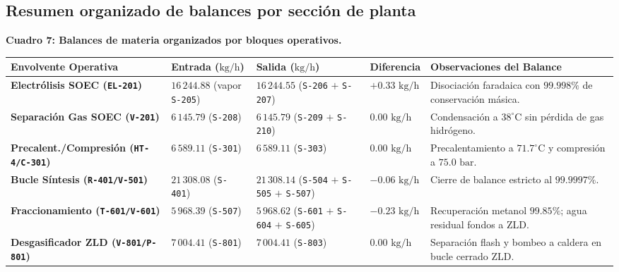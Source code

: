 \documentclass[11pt,letterpaper]{article}
\begin{document}
\subsection{Resumen organizado de balances por sección de planta}

\begin{center}
\footnotesize
\setlength{\tabcolsep}{4pt}
\renewcommand{\arraystretch}{0.98}
\textbf{Cuadro 7: Balances de materia organizados por bloques operativos.}\\[2pt]
\begin{tabularx}{\textwidth}{>{\raggedright\arraybackslash}p{3.8cm} >{\centering\arraybackslash}p{2.7cm} >{\centering\arraybackslash}p{2.9cm} >{\centering\arraybackslash}p{1.9cm} >{\raggedright\arraybackslash}X}
\toprule
\textbf{Envolvente Operativa} & \textbf{Entrada ($\text{kg/h}$)} & \textbf{Salida ($\text{kg/h}$)} & \textbf{Diferencia} & \textbf{Observaciones del Balance} \\
\midrule
\textbf{Electrólisis SOEC (\texttt{EL-201})} & $16\,244.88$ (vapor \texttt{S-205}) & $16\,244.55$ (\texttt{S-206} $+$ \texttt{S-207}) & $+0.33\text{ kg/h}$ & Disociación faradaica con $99.998\%$ de conservación másica. \\
\textbf{Separación Gas SOEC (\texttt{V-201})} & $6\,145.79$ (\texttt{S-208}) & $6\,145.79$ (\texttt{S-209} $+$ \texttt{S-210}) & $0.00\text{ kg/h}$ & Condensación a $38^\circ\text{C}$ sin pérdida de gas hidrógeno. \\
\textbf{Precalent./Compresión (\texttt{HT-4/C-301})} & $6\,589.11$ (\texttt{S-301}) & $6\,589.11$ (\texttt{S-303}) & $0.00\text{ kg/h}$ & Precalentamiento a $71.7^\circ\text{C}$ y compresión a $75.0\text{ bar}$. \\
\textbf{Bucle Síntesis (\texttt{R-401/V-501})} & $21\,308.08$ (\texttt{S-401}) & $21\,308.14$ (\texttt{S-504} $+$ \texttt{S-505} $+$ \texttt{S-507}) & $-0.06\text{ kg/h}$ & Cierre de balance estricto al $99.9997\%$. \\
\textbf{Fraccionamiento (\texttt{T-601/V-601})} & $5\,968.39$ (\texttt{S-507}) & $5\,968.62$ (\texttt{S-601} $+$ \texttt{S-604} $+$ \texttt{S-605}) & $-0.23\text{ kg/h}$ & Recuperación metanol $99.85\%$; agua residual fondos a ZLD. \\
\textbf{Desgasificador ZLD (\texttt{V-801/P-801})} & $7\,004.41$ (\texttt{S-801}) & $7\,004.41$ (\texttt{S-803}) & $0.00\text{ kg/h}$ & Separación flash y bombeo a caldera en bucle cerrado ZLD. \\
\bottomrule
\end{tabularx}
\end{center}
\end{document}
